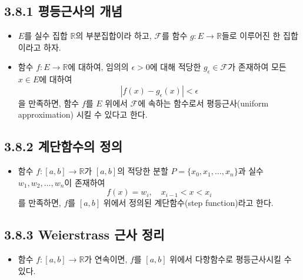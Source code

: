 \documentclass{article}
\begin{document}
\subsection{\fontsize{11.5}{13}\selectfont{해석학에서 다루는 중요한 문제 중의 하나는 주어진 함수를 보다 다루기 쉬운 초등함수로 근사시킬 수 있는가 하는 문제이다.}}

\subsection*{\textmd{3.8.1 평등근사의 개념}}
\begin{itemize}
    \item \( E \)를 실수 집합 \( \mathbb{R} \)의 부분집합이라 하고, \( \mathcal{F} \)를 함수 \( g: E \to \mathbb{R} \)들로 이루어진 한 집합이라고 하자.
    \item 함수 \( f: E \to \mathbb{R} \)에 대하여, 임의의 \( \epsilon > 0 \)에 대해 적당한 \( g_{\epsilon} \in \mathcal{F} \)가 존재하여 모든 \( x \in E \)에 대하여 \[ |f(x) - g_{\epsilon}(x)| < \epsilon \]을 만족하면, 함수 \( f \)를 \( E \) 위에서 \( \mathcal{F} \)에 속하는 함수로서 평등근사(uniform approximation) 시킬 수 있다고 한다.
\end{itemize}

\subsection*{\textmd{3.8.2 계단함수의 정의}}
\begin{itemize}
    \item 함수 \( f: [a,b] \to \mathbb{R} \)가 \([a,b]\)의 적당한 분할 \( P = \{x_0, x_1, \dots, x_n\} \)과 실수 \( w_1, w_2, \dots, w_n \)이 존재하여 \[ f(x) = w_i, \quad x_{i-1} < x < x_i \]를 만족하면, \( f \)를 \([a,b]\) 위에서 정의된 계단함수(step function)라고 한다.
\end{itemize}

\subsection*{\textmd{3.8.3 Weierstrass 근사 정리}}
\begin{itemize}
    \item 함수 \( f: [a,b] \to \mathbb{R} \)가 연속이면, \( f \)를 \([a,b]\) 위에서 다항함수로 평등근사시킬 수 있다.
\end{itemize}





\setcounter{section}{3}
\end{document}
